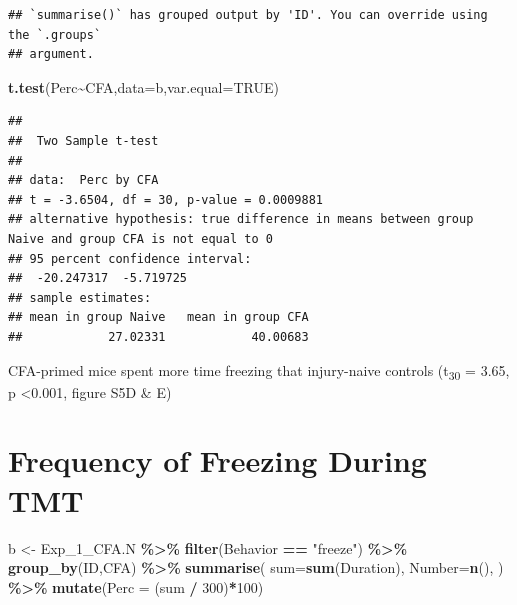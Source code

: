 \documentclass[
]{book}
\newenvironment{Shaded}{\begin{snugshade}}{\end{snugshade}}
\newcommand{\AttributeTok}[1]{\textcolor[rgb]{0.13,0.29,0.53}{#1}}
\newcommand{\ConstantTok}[1]{\textcolor[rgb]{0.56,0.35,0.01}{#1}}
\newcommand{\DecValTok}[1]{\textcolor[rgb]{0.00,0.00,0.81}{#1}}
\newcommand{\FunctionTok}[1]{\textcolor[rgb]{0.13,0.29,0.53}{\textbf{#1}}}
\newcommand{\NormalTok}[1]{#1}
\newcommand{\OtherTok}[1]{\textcolor[rgb]{0.56,0.35,0.01}{#1}}
\newcommand{\SpecialCharTok}[1]{\textcolor[rgb]{0.81,0.36,0.00}{\textbf{#1}}}
\newcommand{\StringTok}[1]{\textcolor[rgb]{0.31,0.60,0.02}{#1}}
\begin{document}
\begin{verbatim}
## `summarise()` has grouped output by 'ID'. You can override using the `.groups`
## argument.
\end{verbatim}

\begin{Shaded}
\begin{Highlighting}[]
\FunctionTok{t.test}\NormalTok{(Perc}\SpecialCharTok{\textasciitilde{}}\NormalTok{CFA,}\AttributeTok{data=}\NormalTok{b,}\AttributeTok{var.equal=}\ConstantTok{TRUE}\NormalTok{)}
\end{Highlighting}
\end{Shaded}

\begin{verbatim}
## 
##  Two Sample t-test
## 
## data:  Perc by CFA
## t = -3.6504, df = 30, p-value = 0.0009881
## alternative hypothesis: true difference in means between group Naive and group CFA is not equal to 0
## 95 percent confidence interval:
##  -20.247317  -5.719725
## sample estimates:
## mean in group Naive   mean in group CFA 
##            27.02331            40.00683
\end{verbatim}

CFA-primed mice spent more time freezing that injury-naive controls (t\textsubscript{30} = 3.65, p \textless0.001, figure S5D \& E)

\section*{Frequency of Freezing During TMT}\label{frequency-of-freezing-during-tmt-1}

\begin{Shaded}
\begin{Highlighting}[]
\NormalTok{b }\OtherTok{\textless{}{-}}\NormalTok{ Exp\_1\_CFA.N  }\SpecialCharTok{\%\textgreater{}\%}
  \FunctionTok{filter}\NormalTok{(Behavior }\SpecialCharTok{==} \StringTok{"freeze"}\NormalTok{) }\SpecialCharTok{\%\textgreater{}\%}
  \FunctionTok{group\_by}\NormalTok{(ID,CFA) }\SpecialCharTok{\%\textgreater{}\%}
  \FunctionTok{summarise}\NormalTok{(}
    \AttributeTok{sum=}\FunctionTok{sum}\NormalTok{(Duration),}
    \AttributeTok{Number=}\FunctionTok{n}\NormalTok{(),}
\NormalTok{  ) }\SpecialCharTok{\%\textgreater{}\%}
  \FunctionTok{mutate}\NormalTok{(}\AttributeTok{Perc =}\NormalTok{ (sum }\SpecialCharTok{/} \DecValTok{300}\NormalTok{)}\SpecialCharTok{*}\DecValTok{100}\NormalTok{)}
\end{Highlighting}
\end{Shaded}
\end{document}
